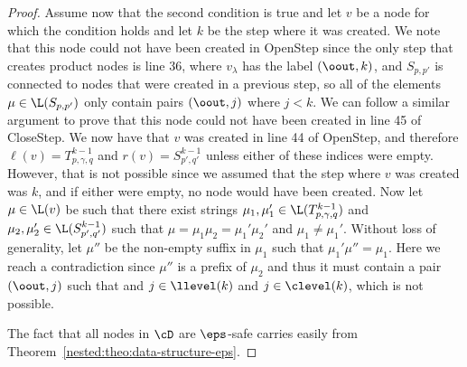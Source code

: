 \begin{proof}
	Assume now that the second condition is true and let $v$ be a node for which the condition holds and let $k$ be the step where it was created. We note that this node could not have been created in {\sc OpenStep} since the only step that creates product nodes is line 36, where $v_{\lambda}$ has the label $(\oout,k)$, and $S_{p,p'}$ is connected to nodes that were created in a previous step, so all of the elements $\mu\in\L(S_{p,p'})$ only contain pairs $(\oout,j)$ where $j < k$. We can follow a similar argument to prove that this node could not have been created in line 45 of {\sc CloseStep}. We now have that $v$ was created in line 44 of {\sc OpenStep}, and therefore $\ell(v) = T^{k-1}_{p,\gamma,q}$ and $r(v) = S^{k-1}_{p',q'}$ unless either of these indices were empty. However, that is not possible since we assumed that the step where $v$ was created was $k$, and if either were empty, no node would have been created. Now let $\mu\in\L(v)$ be such that there exist strings $\mu_1,\mu_1'\in\L(T^{k-1}_{p,\gamma,q})$ and $\mu_2,\mu_2'\in\L(S^{k-1}_{p',q'})$ such that $\mu = \mu_1\mu_2 = \mu_1'\mu_2'$ and $\mu_1 \neq \mu_1'$. Without loss of generality, let $\mu''$ be the non-empty suffix in $\mu_1$ such that $\mu_1'\mu'' = \mu_1$. Here we reach a contradiction since $\mu''$ is a prefix of $\mu_2$ and thus it must contain a pair $(\oout,j)$ such that and $j \in\llevel(k)$ and $j\in\clevel(k)$, which is not possible.
	
	The fact that all nodes in $\cD$ are $\eps$-safe carries easily from Theorem~\ref{nested:theo:data-structure-eps}.
\end{proof}